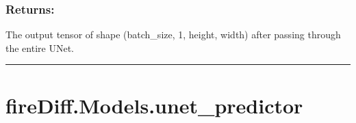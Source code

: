 \documentclass[a4paper,10pt,english]{sphinxmanual}
\begin{document}
\begin{fulllineitems}
\begin{fulllineitems}
\begin{description}
\end{description}


\subsubsection{Returns:}
\label{\detokenize{models:id15}}\begin{description}
\sphinxAtStartPar
The output tensor of shape (batch\_size, 1, height, width)
after passing through the entire U\sphinxhyphen{}Net.

\end{description}

\end{fulllineitems}


\end{fulllineitems}



\bigskip\hrule\bigskip



\section{fireDiff.Models.unet\_predictor}
\label{\detokenize{models:module-fireDiff.Models.unet_predictor}}\label{\detokenize{models:firediff-models-unet-predictor}}
\end{document}
